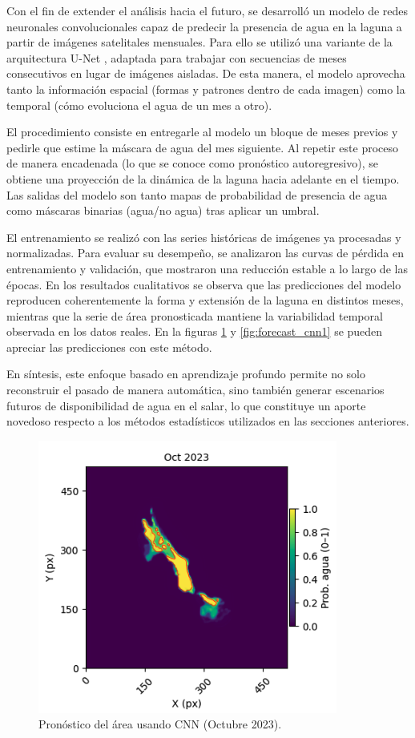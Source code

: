 Con el fin de extender el análisis hacia el futuro, se desarrolló un modelo de redes neuronales convolucionales capaz de predecir la presencia de agua en la laguna a partir de imágenes satelitales mensuales. Para ello se utilizó una variante de la arquitectura U-Net , adaptada para trabajar con secuencias de meses consecutivos en lugar de imágenes aisladas. De esta manera, el modelo aprovecha tanto la información espacial (formas y patrones dentro de cada imagen) como la temporal (cómo evoluciona el agua de un mes a otro).

El procedimiento consiste en entregarle al modelo un bloque de meses previos y pedirle que estime la máscara de agua del mes siguiente. Al repetir este proceso de manera encadenada (lo que se conoce como pronóstico autoregresivo), se obtiene una proyección de la dinámica de la laguna hacia adelante en el tiempo. Las salidas del modelo son tanto mapas de probabilidad de presencia de agua como máscaras binarias (agua/no agua) tras aplicar un umbral.

El entrenamiento se realizó con las series históricas de imágenes ya procesadas y normalizadas. Para evaluar su desempeño, se analizaron las curvas de pérdida en entrenamiento y validación, que mostraron una reducción estable a lo largo de las épocas. En los resultados cualitativos se observa que las predicciones del modelo reproducen coherentemente la forma y extensión de la laguna en distintos meses, mientras que la serie de área pronosticada mantiene la variabilidad temporal observada en los datos reales. En la figuras \ref{fig:forecast_cnn} y \ref{fig:forecast_cnn1} se pueden apreciar las predicciones con este método. 

En síntesis, este enfoque basado en aprendizaje profundo permite no solo reconstruir el pasado de manera automática, sino también generar escenarios futuros de disponibilidad de agua en el salar, lo que constituye un aporte novedoso respecto a los métodos estadísticos utilizados en las secciones anteriores.

\begin{figure}[H]
    \centering
    \includegraphics[scale=0.50]{Figures/forecast_cnn1.png}
    \caption{Pronóstico del área usando CNN (Octubre 2023).}
    \label{fig:forecast_cnn}
\end{figure}




